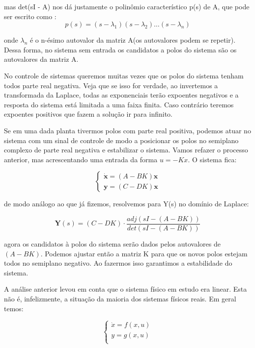 \documentclass[journal]{IEEEtran}
\begin{document}
mas det(sI - A) nos dá justamente o polinômio característico p(s) de 
A, que pode ser escrito como :
\begin{equation}
p(s) = (s - \lambda _1)(s - \lambda _2) \ldots (s - 
\lambda _n)
\end{equation}

onde $\lambda _n$ é o n-ésimo autovalor da matriz A(os autovalores 
podem se repetir). Dessa forma, no sistema sem entrada os candidatos
a polos do sistema são os autovalores da matriz A.

No controle de sistemas queremos muitas vezes que os polos do sistema
tenham todos parte real negativa. Veja que se isso for verdade, ao 
invertemos a transformada da Laplace, todas as exponenciais terão 
expoentes negativos e a resposta do sistema está limitada a uma
faixa finita. Caso 
contrário teremos expoentes positivos que fazem a solução ir para 
infinito.

Se em uma dada planta tivermos polos com parte real positiva, podemos 
atuar no sistema com um sinal de controle de modo a posicionar os 
polos no semiplano complexo de parte real negativa e estabilizar o 
sistema. Vamos refazer o processo anterior, mas acrescentando uma 
entrada da forma $u = -Kx$. O sistema fica:

\begin{equation}
\left\{
\begin{array}{l}
\dot{\textbf{x}} = (A - BK)\textbf{x}\\
\textbf{y} = (C - DK)\textbf{x} 
\end{array}
\right.
\end{equation}

de modo análogo ao que já fizemos, resolvemos para Y(s) no domínio
de Laplace:

\begin{equation}
 \textbf{Y}(s) = (C - DK)\cdot \frac{adj(sI - (A - BK))}{det(sI - (A 
- BK))} 
\end{equation}

agora os candidatos à polos do sistema serão dados pelos autovalores 
de $(A - BK)$. Podemos ajustar então a matriz K para que os novos
polos estejam todos no semiplano negativo. Ao fazermos isso 
garantimos a estabilidade do sistema.

A análise anterior levou em conta que o sistema físico em estudo 
era linear. Esta não é, infelizmente, a situação da maioria dos 
sistemas físicos reais. Em geral temos:

\begin{equation}
 \left\{
      \begin{array}{l}
       \dot{x} = f(x, u) \\
       y = g(x, u) \\
      \end{array}
 \right.
\end{equation}
\end{document}
